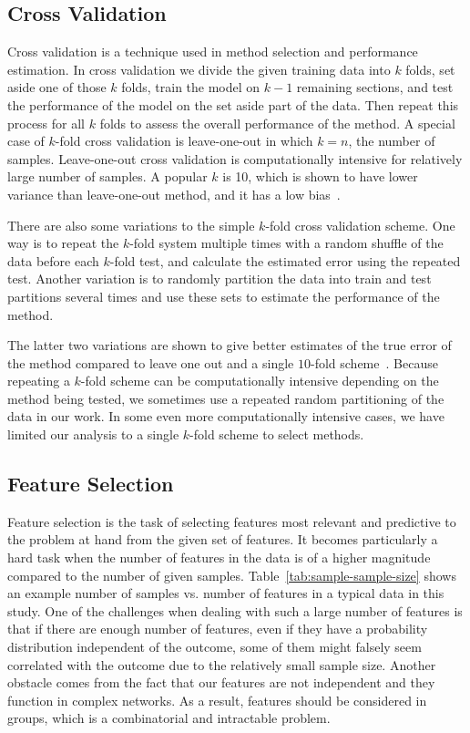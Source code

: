 \subsection{Cross Validation}
\label{chap:cross-validation}

Cross validation is a technique used in method selection and performance estimation. In cross validation we divide the given training data into $k$ folds, set aside one of those $k$ folds, train the model on $k - 1$ remaining sections, and test the performance of the model on the set aside part of the data. Then repeat this process for all $k$ folds to assess the overall performance of the method. A special case of $k$-fold cross validation is leave-one-out in which $k=n$, the number of samples. Leave-one-out cross validation is computationally intensive for relatively large number of samples. A popular $k$ is 10, which is shown to have lower variance than leave-one-out method, and it has a low bias~\cite[Ch. 7]{statistical-learning}. 

There are also some variations to the simple $k$-fold cross validation scheme. One way is to repeat the $k$-fold system multiple times with a random shuffle of the data before each $k$-fold test, and calculate the estimated error using the repeated test. Another variation is to randomly partition the data into train and test partitions several times and use these sets to estimate the performance of the method.

The latter two variations are shown to give better estimates of the true error of the method compared to leave one out and a single $10$-fold scheme~\cite{kim2009estimating, efron1994introduction}. Because repeating a $k$-fold scheme can be computationally intensive depending on the method being tested, we sometimes use a repeated random partitioning of the data in our work. In some even more computationally intensive cases, we have limited our analysis to a single $k$-fold scheme to select methods.
  
\subsection{Feature Selection}
Feature selection is the task of selecting features most relevant and predictive to the problem at hand from the given set of features. It becomes particularly a hard task when the number of features in the data is of a higher magnitude compared to the number of given samples. Table~\ref{tab:sample-sample-size} shows an example number of samples vs. number of features in a typical data in this study. One of the challenges when dealing with such a large number of features is that if there are enough number of features, even if they have a probability distribution independent of the outcome, some of them might falsely seem correlated with the outcome due to the relatively small sample size. Another obstacle comes from the fact that our features are not independent and they function in complex networks. As a result, features should be considered in groups, which is a combinatorial and intractable problem.

